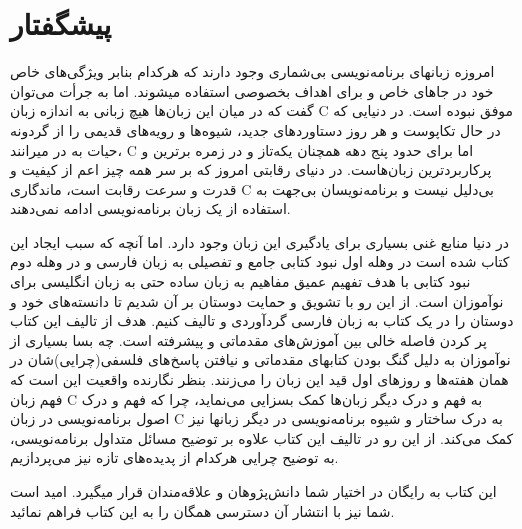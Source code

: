 \chapter*{پیشگفتار}
امروزه زبانهای برنامه‌نویسی بی‌شماری وجود دارند که هرکدام بنابر ویژگی‌های خاص خود در جاهای خاص و برای اهداف بخصوصی استفاده میشوند. اما به جرأت می‌توان گفت که در میان این زبان‌ها هیچ زبانی به اندازه زبان C موفق نبوده است. در دنیایی که در حال تکاپوست و هر روز دستاوردهای جدید، شیوه‌ها و رویه‌های قدیمی را از گردونه حیات به در میرانند، C اما برای حدود پنج دهه همچنان یکه‌تاز و در زمره برترین و پرکاربردترین زبان‌هاست. در دنیای رقابتی امروز که بر سر همه چیز اعم از کیفیت و قدرت و سرعت رقابت است، ماندگاری C بی‌دلیل نیست و برنامه‌نویسان بی‌جهت به استفاده از یک زبان برنامه‌نویسی ادامه نمی‌دهند.

در دنیا منابع غنی بسیاری برای یادگیری این زبان وجود دارد. اما آنچه که سبب ایجاد این کتاب شده است در وهله اول نبود کتابی جامع و تفصیلی به زبان فارسی و در وهله دوم نبود کتابی با هدف تفهیم عمیق مفاهیم به زبان ساده حتی به زبان انگلیسی برای نوآموزان است. از این رو با تشویق و حمایت دوستان بر آن شدیم تا دانسته‌های خود و دوستان را در یک کتاب به زبان فارسی گردآوردی و تالیف کنیم. هدف از تالیف این کتاب پر کردن فاصله خالی بین آموزش‌های مقدماتی و پیشرفته است. چه بسا بسیاری از نوآموزان به دلیل گنگ بودن کتابهای مقدماتی و نیافتن پاسخ‌های فلسفی(چرایی)شان در همان هفته‌ها و روزهای اول قید این زبان را می‌زنند. بنظر نگارنده واقعیت این است که فهم زبان C به فهم و درک دیگر زبان‌ها کمک بسزایی می‌نماید، چرا که فهم و درک اصول برنامه‌نویسی در زبان C به درک ساختار و شیوه برنامه‌نویسی در دیگر زبانها نیز کمک می‌کند. از این رو در تالیف این کتاب علاوه بر توضیح مسائل متداول برنامه‌نویسی، به توضیح چرایی هرکدام از پدیده‌های تازه نیز می‌پردازیم. 

این کتاب به رایگان در اختیار شما دانش‌پژوهان و علاقه‌مندان قرار میگیرد. امید است شما نیز با انتشار  آن دسترسی همگان را به این کتاب فراهم نمائید.
